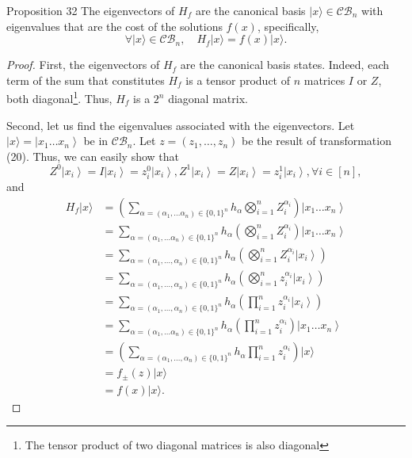 \begin{proposition}
    Proposition 32 The eigenvectors of $H_{f}$ are the canonical basis $|x\rangle \in \mathcal{C B}_{n}$ with eigenvalues that are the cost of the solutions $f(x)$, specifically,
\begin{equation*}
\forall|x\rangle \in \mathcal{C B}_{n}, \quad H_{f}|x\rangle=f(x)|x\rangle. \tag{21}
\end{equation*}
\end{proposition}
\begin{proof}
    First, the eigenvectors of $H_{f}$ are the canonical basis states. Indeed, each term of the sum that constitutes $H_{f}$ is a tensor product of $n$ matrices $I$ or $Z$, both diagonal\footnote{The tensor product of two diagonal matrices is also diagonal}. Thus, $H_{f}$ is a $2^{n}$ diagonal matrix. 
    
    Second, let us find the eigenvalues associated with the eigenvectors. Let $|x\rangle=\left|x_{1} \ldots x_{n}\right\rangle$ be in $\mathcal{C B}_{n}$. Let $z=\left(z_{1}, \ldots, z_{n}\right)$ be the result of transformation (20). Thus, we can easily show that 
$$
Z^{0}\left|x_{i}\right\rangle=I\left|x_{i}\right\rangle=z_{i}^{0}\left|x_{i}\right\rangle,Z^{1}\left|x_{i}\right\rangle=Z\left|x_{i}\right\rangle=z_{i}^{1}\left|x_{i}\right\rangle, \forall i \in[n],
$$
and
$$
\begin{aligned}
H_{f}|x\rangle 
& =\left(\sum_{\alpha=\left(\alpha_{1}, \ldots \alpha_{n}\right) \in\{0,1\}^{n}} h_{\alpha} \bigotimes_{i=1}^{n} Z_{i}^{\alpha_{i}}\right) \left|x_{1} \ldots x_{n}\right\rangle\\
& =\sum_{\alpha=\left(\alpha_{1}, \ldots \alpha_{n}\right) \in\{0,1\}^{n}} h_{\alpha} \left(\bigotimes_{i=1}^{n} Z_{i}^{\alpha_{i}}\right) \left|x_{1} \ldots x_{n}\right\rangle\\
& =\sum_{\alpha=\left(\alpha_{1}, \ldots, \alpha_{n}\right) \in\{0,1\}^{n}} h_{\alpha} \left( \bigotimes_{i=1}^{n} Z_{i}^{\alpha_{i}}\left|x_{i}\right\rangle\right) \\
& =\sum_{\alpha=\left(\alpha_{1}, \ldots, \alpha_{n}\right) \in\{0,1\}^{n}} h_{\alpha} \left(\bigotimes_{i=1}^{n} z_{i}^{\alpha_{i}}\left|x_{i}\right\rangle\right) \\
& =\sum_{\alpha=\left(\alpha_{1}, \ldots, \alpha_{n}\right) \in\{0,1\}^{n}} h_{\alpha} \left(\prod_{i=1}^{n} z_{i}^{\alpha_{i}}\left|x_{i}\right\rangle\right) \\
& =\sum_{\alpha=\left(\alpha_{1}, \ldots \alpha_{n}\right) \in\{0,1\}^{n}} h_{\alpha} \left(\prod_{i=1}^{n} z_{i}^{\alpha_{i}}\right) \left|x_{1} \ldots x_{n}\right\rangle\\
& =\left(\sum_{\alpha=\left(\alpha_{1}, \ldots, \alpha_{n}\right) \in\{0,1\}^{n}} h_{\alpha} \prod_{i=1}^{n} z_{i}^{\alpha_{i}}\right)|x\rangle \\
& =f_{ \pm}(z)|x\rangle \\
& =f(x)|x\rangle .
\end{aligned}
$$
\end{proof}
